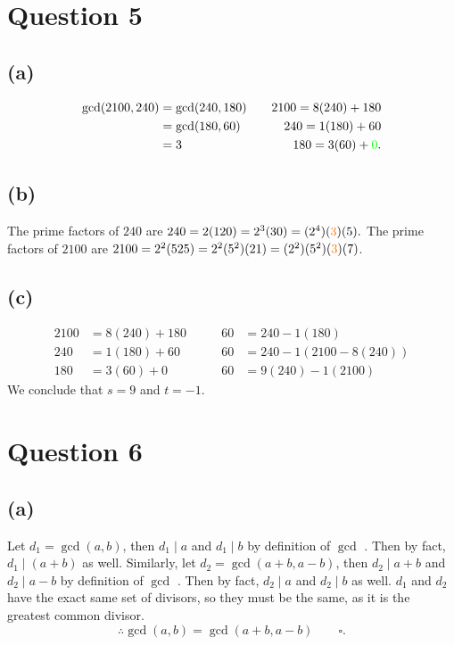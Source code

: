 \documentclass[12pt]{article}
\begin{document}
	\section*{Question 5}
		\subsection*{(a)}
			\begin{align*}
				\gcd(2100,240) &= \gcd(240,180) \quad &2100=8(240)+180 \\
				&= \gcd(180,60) \quad&240 = 1(180) + 60\\
				&=3 \quad &180 = 3(60) + \textcolor{green}{0}.
			\end{align*}
		\subsection*{(b)}
			The prime factors of $240$ are $240 = 2(120) = 2^{3}(30) = (2^{4})(\textcolor{orange}{3})(5).$ The prime factors of $2100$ are $2100 = 2^{2}(525) = 2^{2}(5^{2})(21) = (2^{2})(5^{2})(\textcolor{orange}{3})(7)$. 
		\subsection*{(c)}
			\begin{align*}
				2100 & = 8(240) + 180 \qquad &60&=240 - 1(180) \\
				240 &= 1(180) + 60  \qquad  &60 &= 240 - 1(2100 - 8(240)) \\
				180 &= 3(60) + 0 \qquad  &60 &= 9(240) - 1(2100)
			\end{align*}
			We conclude that $s = 9$ and $t = -1$.
	\section*{Question 6}
		\subsection*{(a)}
			Let $d_{1} = \gcd(a,b)$, then $d_{1} \mid a$ and $d_{1} \mid b$ by definition of $\gcd$ . Then by fact, $d_{1} \mid (a+b)$ as well. Similarly, let $d_{2} = \gcd(a+b,a-b)$, then $d_{2} \mid a+b$ and $d_{2} \mid a-b$ by definition of $\gcd$ . Then by fact, $d_{2} \mid a$ and $d_{2} \mid b$ as well. $d_{1}$ and $d_{2}$ have the exact same set of divisors, so they must be the same, as it is the greatest common divisor. $$ \therefore \gcd(a,b) = \gcd(a+b, a-b) \qquad \square.$$
\end{document}
